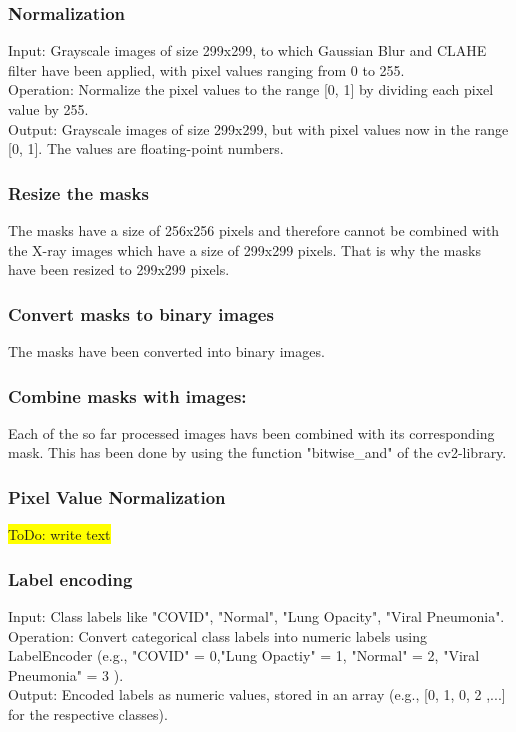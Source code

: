 \documentclass{article}
\begin{document}
\subsubsection{Normalization}
Input: Grayscale images of size 299x299, to which Gaussian Blur and CLAHE filter have been applied, with pixel values ranging from 0 to 255.\\
Operation: Normalize the pixel values to the range [0, 1] by dividing each pixel value by 255.\\
Output: Grayscale images of size 299x299, but with pixel values now in the range [0, 1]. The values are floating-point numbers.\\

\subsubsection{Resize the masks}
The masks have a size of 256x256 pixels and therefore cannot be combined with the X-ray images which have a size of 299x299 pixels. 
That is why the masks have been resized to 299x299 pixels.

\subsubsection{Convert masks to binary images}
The masks have been converted into binary images. 

\subsubsection{Combine masks with images:}
Each of the so far processed images havs been combined with its corresponding mask. This has been done by using the function "bitwise\_and" of the cv2-library.\\

\subsubsection{Pixel Value Normalization}
    \colorbox{yellow}{ToDo: write text}
    
\subsubsection{Label encoding}
Input: Class labels like "COVID", "Normal", "Lung Opacity", "Viral Pneumonia".\\
Operation: Convert categorical class labels into numeric labels using LabelEncoder (e.g., "COVID" = 0,"Lung Opactiy" = 1, "Normal" = 2, "Viral Pneumonia" = 3 ).\\
Output: Encoded labels as numeric values, stored in an array (e.g., [0, 1, 0, 2 ,...] for the respective classes).\\
\end{document}
